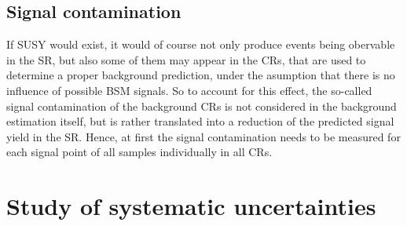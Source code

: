 \subsection{Signal contamination}\label{sec:signalCont}
If SUSY would exist, it would of course not only produce events being obervable in the SR, but also some of them may appear in the CRs, that are used to determine a proper background prediction, under the asumption that there is no influence of possible BSM signals. So to account for this effect, the so-called signal contamination of the background CRs is not considered in the background estimation itself, but is rather translated into a reduction of the predicted signal yield in the SR. Hence, at first the signal contamination needs to be measured for each signal point of all samples individually in all CRs.



\section{Study of systematic uncertainties}\label{sec:Syst}
